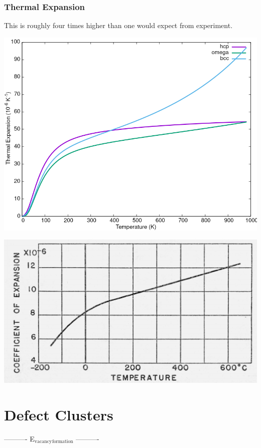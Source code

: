 \documentclass[11pt]{article}
\begin{document}
\subsubsection{Thermal Expansion}
\label{sec:orgf86668e}

This is roughly four times higher than one would expect from
experiment. 
\begin{center}
\includegraphics[width=.9\linewidth]{Images/thermal_expansion_all_phases_2020-04-02.png}
\end{center}

\begin{center}
\includegraphics[width=.9\linewidth]{Images/thermal_expansion_alpha_ti_exp.png}
\end{center}

\section{Defect Clusters}
\label{sec:org3e44582}

----------     E\(_{\text{vacancy}}\)\(_{\text{formation}}\)     ----------
\end{document}
